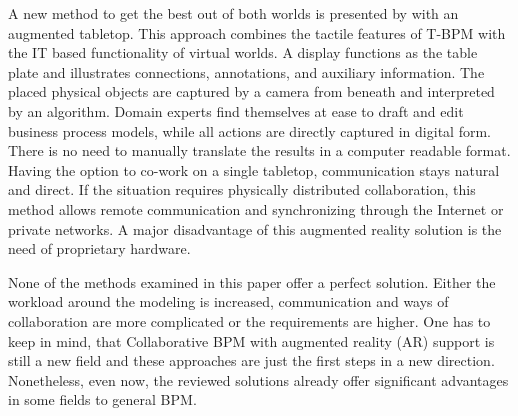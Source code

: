 A new method to get the best out of both worlds is presented by  with an augmented tabletop. This approach combines
the tactile features of T-BPM with the IT based functionality of virtual worlds. A display functions as the table plate and 
illustrates connections, annotations, and auxiliary information. The placed physical objects are captured by a camera from 
beneath and interpreted by an algorithm. Domain experts find themselves at ease to draft and edit business process models, 
while all actions are directly captured in digital form. There is no need to manually translate the results in 
a computer readable format. Having the option to co-work on a single tabletop, communication stays natural and direct.
If the situation requires physically distributed collaboration, this method allows remote communication and synchronizing 
through the Internet or private networks. A major disadvantage of this augmented reality solution is the
need of proprietary hardware.


None of the methods examined in this paper offer a perfect solution. Either the workload around the modeling is increased,
communication and ways of collaboration are more complicated or the requirements are higher. One has to keep in mind, 
that Collaborative BPM with augmented reality (AR) support is still a new field and these approaches are just the first steps
in a new direction. Nonetheless, even now, the reviewed solutions already offer significant advantages in some fields to general BPM.




